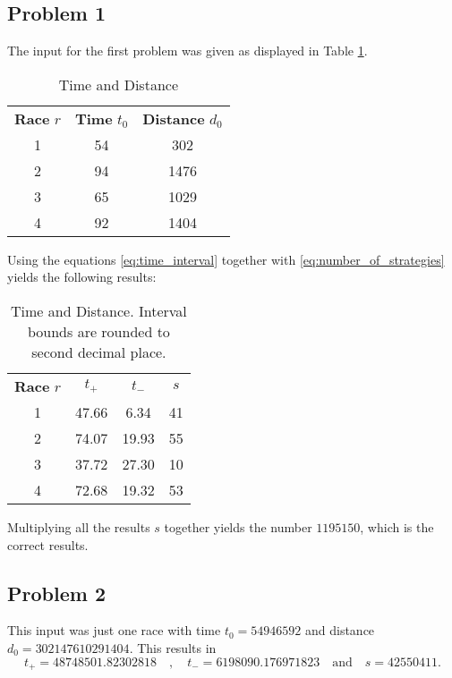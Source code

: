 \documentclass{article}
\begin{document}
\subsection*{Problem 1}
The input for the first problem was given as displayed in Table \ref{tab:time_distance}.
\begin{table}[ht]
    \centering
    \begin{tabular}{ccc}
        \textbf{Race} $r$ & \textbf{Time} $t_0$& \textbf{Distance} $d_0$\\
        1 & 54 & 302 \\
        2 & 94 & 1476 \\
        3 & 65 & 1029 \\
        4 & 92 & 1404 \\
    \end{tabular}
    \caption{Time and Distance}
    \label{tab:time_distance}
\end{table}
Using the equations \ref{eq:time_interval} together with \ref{eq:number_of_strategies} yields the following results:
\begin{table}[ht]
    \centering
    \begin{tabular}{cccc}
        \textbf{Race} $r$ & \textbf{$t_+$} & \textbf{$t_-$} & \textbf{$s$}\\
        1 & 47.66 & 6.34 & 41\\
        2 & 74.07 & 19.93 & 55\\
        3 & 37.72 & 27.30 & 10\\
        4 & 72.68 & 19.32 & 53\\
    \end{tabular}
    \caption{Time and Distance. Interval bounds are rounded to second decimal place.}
    \label{tab:day1_results}
\end{table}
Multiplying all the results $s$ together yields the number $1195150$, which is the correct results.
\newpage
\subsection*{Problem 2}
This input was just one race with time $t_0 = 54946592$ and distance $d_0 = 302147610291404$. This results in 
\begin{equation*}
    t_+ = 48748501.82302818 \quad,\quad t_- = 6198090.176971823 \quad \text{and} \quad s = 42550411.
\end{equation*}
\end{document}
